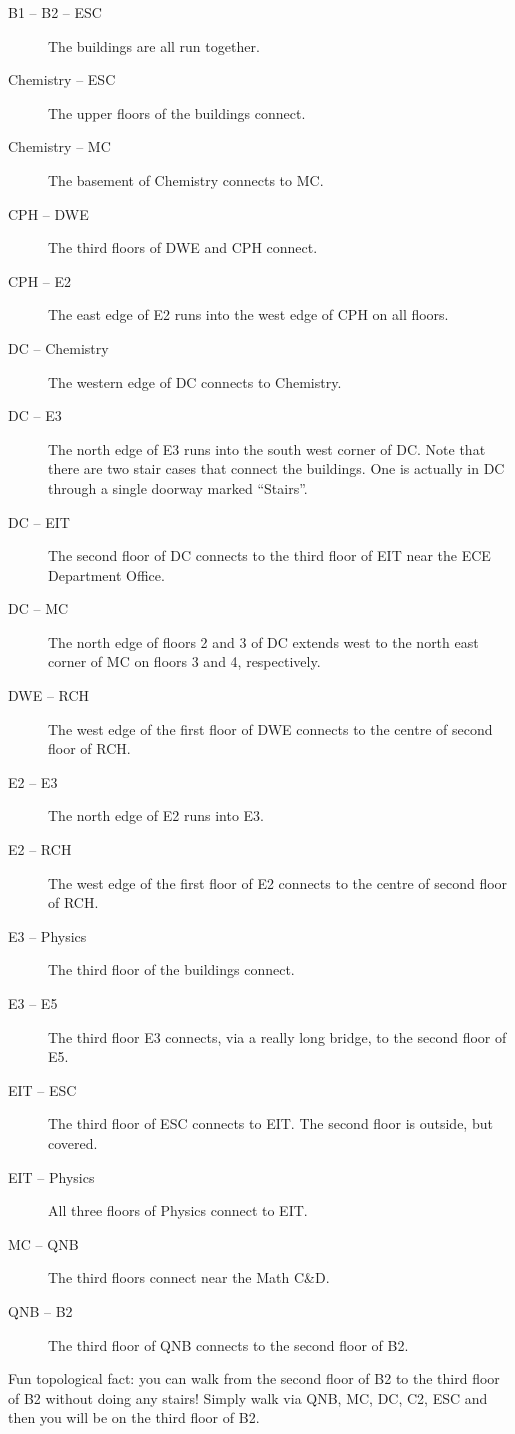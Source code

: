 \documentclass{book}
\begin{document}
\begin{description}
\item[B1 -- B2 -- ESC] The buildings are all run together.
\item[Chemistry -- ESC] The upper floors of the buildings connect.
\item[Chemistry -- MC] The basement of Chemistry connects to MC.
\item[CPH -- DWE] The third floors of DWE and CPH connect.
\item[CPH -- E2] The east edge of E2 runs into the west edge of CPH on all floors.
\item[DC -- Chemistry] The western edge of DC connects to Chemistry.
\item[DC -- E3] The north edge of E3 runs into the south west corner of DC. Note that there are two stair cases that connect the buildings. One is actually in DC through a single doorway marked ``Stairs''.
\item[DC -- EIT] The second floor of DC connects to the third floor of EIT near the ECE Department Office.
\item[DC -- MC] The north edge of floors 2 and 3 of DC extends west to the north east corner of MC on floors 3 and 4, respectively.
\item[DWE -- RCH] The west edge of the first floor of DWE connects to the centre of second floor of RCH.
\item[E2 -- E3] The north edge of E2 runs into E3.
\item[E2 -- RCH] The west edge of the first floor of E2 connects to the centre of second floor of RCH.
\item[E3 -- Physics] The third floor of the buildings connect.
\item[E3 -- E5] The third floor E3 connects, via a really long bridge, to the second floor of E5.
\item[EIT -- ESC] The third floor of ESC connects to EIT. The second floor is outside, but covered.
\item[EIT -- Physics] All three floors of Physics connect to EIT.
\item[MC -- QNB] The third floors connect near the Math C\&D.
\item[QNB -- B2] The third floor of QNB connects to the second floor of B2.
\end{description}

Fun topological fact: you can walk from the second floor of B2 to the third floor of B2 without doing any stairs! Simply walk via QNB, MC, DC, C2, ESC and then you will be on the third floor of B2.
\end{document}
